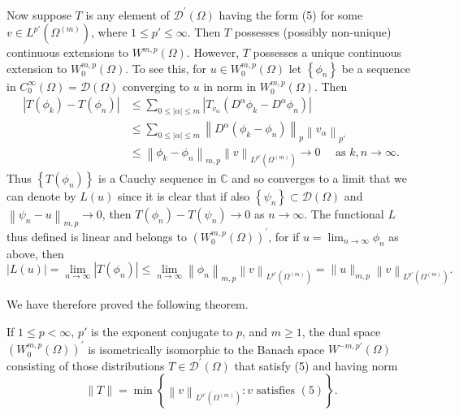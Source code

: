 \begin{para}
  Now suppose $T$ is any element of $\mathscr{D}^{\prime}(\Omega)$ having the form (5) for some $v \in L^{p'}(\Omega^{(m)})$, where $1 \leq p' \leq \infty$. Then $T$ possesses (possibly non-unique) continuous extensions to $W^{m,p}(\Omega)$. However, $T$ possesses a unique continuous extension to $W_0^{m, p}(\Omega)$. To see this, for $u \in W_0^{m, p}(\Omega)$ let $\left\{\phi_n\right\}$ be a sequence in $C_0^{\infty}(\Omega)=\mathscr{D}(\Omega)$ converging to $u$ in norm in $W_0^{m, p}(\Omega)$. Then
  \[
  \begin{aligned}
  \left|T\left(\phi_k\right)-T\left(\phi_n\right)\right| & \leq \sum_{0 \leq|\alpha| \leq m}\left|T_{v_\alpha}\left(D^\alpha \phi_k-D^\alpha \phi_n\right)\right| \\
  & \leq \sum_{0 \leq|\alpha| \leq m}\left\|D^\alpha\left(\phi_k-\phi_n\right)\right\|_p\left\|v_\alpha\right\|_{p'} \\
  & \leq\left\|\phi_k-\phi_n\right\|_{m,p}\left\|v\right\|_{L^{p'}(\Omega^{(m)})} \rightarrow 0 \quad \text { as } k, n \rightarrow \infty .
  \end{aligned}
  \]
  Thus $\left\{T\left(\phi_n\right)\right\}$ is a Cauchy sequence in $\mathbb{C}$ and so converges to a limit that we can denote by $L(u)$ since it is clear that if also $\left\{\psi_n\right\} \subset \mathscr{D}(\Omega)$ and $\left\|\psi_n-u\right\|_{m,p} \rightarrow 0$, then $T\left(\phi_n\right)-T\left(\psi_n\right) \rightarrow 0$ as $n \rightarrow \infty$. The functional $L$ thus defined is linear and belongs to $\left(W_0^{m, p}(\Omega)\right)^{\prime}$, for if $u=\lim _{n \rightarrow \infty} \phi_n$ as above, then
  \[
  |L(u)|=\lim _{n \rightarrow \infty}\left|T\left(\phi_n\right)\right| \leq \lim _{n \rightarrow \infty}\left\|\phi_n\right\|_{m,p}\left\|v\right\|_{L^{p'}(\Omega^{(m)})}=\|u\|_{m,p}\left\|v\right\|_{L^{p'}(\Omega^{(m)})} .
  \]
\end{para}

We have therefore proved the following theorem.


\begin{theorem}
  If $1 \leq p<\infty$, $p'$ is the exponent conjugate to $p$, and $m \geq 1$, the dual space $\left(W_0^{m, p}(\Omega)\right)^{\prime}$ is isometrically isomorphic to the Banach space $W^{-m, p'}(\Omega)$ consisting of those distributions $T \in \mathscr{D}^{\prime}(\Omega)$ that satisfy (5) and having norm
  \[
  \|T\|=\min \left\{\left\|v\right\|_{L^{p'}(\Omega^{(m)})}: v \text { satisfies }(5)\right\} .
  \]
\end{theorem}

